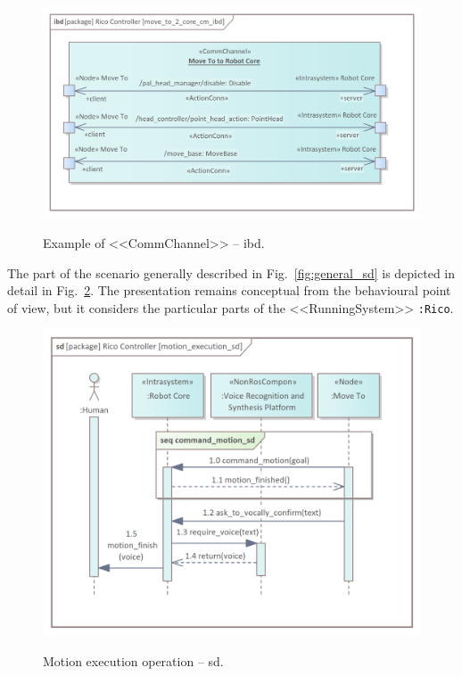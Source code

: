 \documentclass[11pt,oneside,a4paper]{article}
\begin{document}
	\begin{figure}[H]
		\centering
		\begin{center}
			{\includegraphics[scale=1.0]{img/rico_pkg/move_to_2_core_cm_ibd.png}}
		\end{center}
		\caption{Example of <<CommChannel>> -- ibd.} 
		\label{fig:move_to_2_core_cm_ibd}
	\end{figure}
	
	
	\pagebreak
	
	The part of the scenario generally described in Fig.~\ref{fig:general_sd} is depicted in detail in Fig.~\ref{fig:motion_execution_sd}. The presentation remains conceptual from the behavioural point of view, but it considers the particular parts of the <<RunningSystem>> \texttt{:Rico}.
	
	\begin{figure}[H]
		\centering
		\begin{center}
			{\includegraphics[scale=1.0]{img/rico_pkg/motion_execution_sd.png}}
		\end{center}
		\caption{Motion execution operation -- sd.} 
		\label{fig:motion_execution_sd}
	\end{figure}
\end{document}
